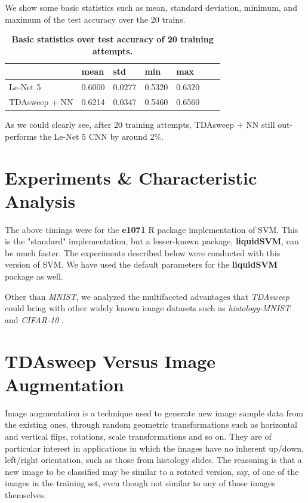 \documentclass{article}
\begin{document}
We show some basic statistics such as mean, standard deviation, minimum, and maximum of the test accuracy over the 20 trains.
\begin{table}[!ht]
\centering
\caption{{\bf Basic statistics over test accuracy of 20 training attempts.}}
\begin{tabular}{|l|l|l|l|l|l|l|}
\hline
\multicolumn{1}{|l|}{} & \multicolumn{1}{|l|}{\bf mean} & \multicolumn{1}{|l|}{\bf std} & \multicolumn{1}{|l|}{\bf min}& \multicolumn{1}{|l|}{\bf max}\\ \hline
Le-Net 5 & 0.6000 & 0.0277 & 0.5320 & 0.6320 \\ \hline
TDAsweep + NN & 0.6214 & 0.0347 & 0.5460 & 0.6560  \\ \hline

\end{tabular}
\label{tda_aug}
\end{table}

As we could clearly see, after 20 training attempts, TDAsweep + NN still out-performs the Le-Net 5 CNN by around 2\%.







\section{Experiments \& Characteristic Analysis}
The above timings were for the \textbf{e1071} R package implementation of SVM. This is the "standard" implementation, but a lesser-known package, \textbf{liquidSVM}, can be much faster. The experiments described below were conducted with this version of SVM. We have used the default parameters for the \textbf{liquidSVM} package as well.

Other than \emph{MNIST}, we analyzed the multifaceted advantages that \emph{TDAsweep} could bring with other widely known image datasets such as \emph{histology-MNIST} \cite{kather_weis_bianconi_melchers_schad_gaiser_marx_zöllner_2016} and \emph{CIFAR-10} \cite{Krizhevsky09learningmultiple}.

\section{TDAsweep Versus Image Augmentation}
Image augmentation is a technique used to generate new image sample data from the existing ones, through random geometric transformations such as horizontal and vertical flips, rotations, scale transformations and so on. They are of particular interest in applications in which the images have no inherent up/down, left/right orientation, such as those from histology slides. The reasoning is that a new image to be classified may be similar to a rotated version, say, of one of the images in the training set, even though not similar to any of those images themselves.
\end{document}
